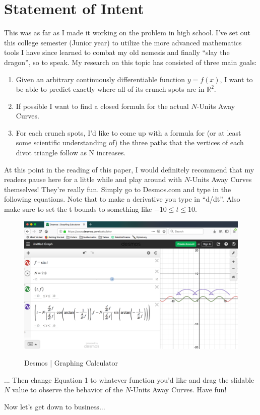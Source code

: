 \section{Statement of Intent}

This was as far as I made it working on the problem in high school. I’ve set out this college semester (Junior year) to utilize the more advanced mathematics tools I have since learned to combat my old nemesis and finally ``slay the dragon'', so to speak. My research on this topic has consisted of three main goals:

\begin{enumerate}
    \item Given an arbitrary continuously differentiable function $y = f(x)$, I want to be able to predict exactly where all of its crunch spots are in $\mathbb{R}^2$.
    \item If possible I want to find a closed formula for the actual $N$-Units Away Curves.
    \item For each crunch spots, I’d like to come up with a formula for (or at least some scientific understanding of) the three paths that the vertices of each divot triangle follow as N increases.
\end{enumerate}

At this point in the reading of this paper, I would definitely recommend that my readers pause here for a little while and play around with $N$-Units Away Curves themselves! They’re really fun. Simply go to Desmos.com and type in the following equations. Note that to make a derivative you type in ``d/dt''. Also make sure to set the t bounds to something like $-10 \leq t \leq 10$.

\renewcommand\w{0.8\linewidth}
\renewcommand\fw{0.9\linewidth}

\begin{figure}[H]
  \centering
  \begin{minipage}[b]{0.8\linewidth}
    \label{intent:1}
    \includegraphics[width=\linewidth]{img/04-statement-of-intent/01.png}
    \caption{Desmos | Graphing Calculator}
  \end{minipage}
\end{figure}

... Then change Equation 1 to whatever function you’d like and drag the slidable $N$ value to
observe the behavior of the $N$-Units Away Curves. Have fun!

Now let’s get down to business...
